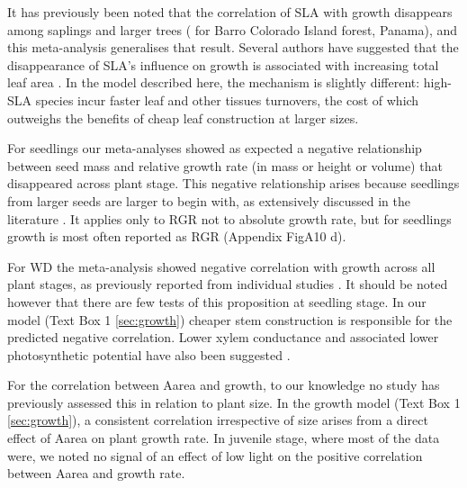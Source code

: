 \documentclass[a4paper]{article}\usepackage[]{graphicx}\usepackage[]{color}
\begin{document}
It has previously been noted that the correlation of SLA with growth disappears among saplings and larger trees (\citealt{Wright:2010tp} for Barro Colorado Island forest, Panama), and this meta-analysis generalises that result. Several authors have suggested that the disappearance of SLA's influence on growth is associated with increasing total leaf area \citep{Reich:1992wm,Poorter:2008iu,Wright:2010tp}. In the model described here, the mechanism is slightly different: high-SLA species incur faster leaf and other tissues turnovers, the cost of which outweighs the benefits of cheap leaf construction at larger sizes.

For seedlings our meta-analyses showed as expected a negative relationship between seed mass and relative growth rate (in mass or height or volume) that disappeared across plant stage. This negative relationship arises because seedlings from larger seeds are larger to begin with, as extensively discussed in the literature \citep[reviewed by][]{Turnbull:2012ew}. It applies only to RGR not to absolute growth rate, but for seedlings growth is most often reported as RGR (Appendix FigA10 d).

For WD the meta-analysis showed negative correlation with growth across all plant stages, as previously reported from individual studies \citep{Wright:2010tp,Ruger:2012jv}. It should be noted however that there are few tests of this proposition at seedling stage. In our model (Text Box 1 \ref{sec:growth}) cheaper stem construction is responsible for the predicted negative correlation. Lower xylem conductance and associated lower photosynthetic potential have also been suggested \citep[reviewed by][]{Chave:2009iy}. 

For the correlation between Aarea and growth, to our knowledge no study has previously assessed this in relation to plant size. In the growth model (Text Box 1 \ref{sec:growth}), a consistent correlation irrespective of size arises from a direct effect of Aarea on plant growth rate. In juvenile stage, where most of the data were, we noted no signal of an effect of low light on the positive correlation between Aarea and growth rate.
\end{document}
